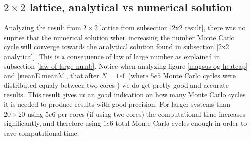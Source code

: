 \documentclass[a4paper, 10pt]{article}
\begin{document}
\subsection{$2\times 2$ lattice, analytical vs numerical solution}
Analyzing the result from $2\times 2$ lattice from subsection \eqref{2x2 result}, there was no suprise that the numerical
solution when increasing the number Monte Carlo cycle will converge towards the analytical solution found in subsection \eqref{2x2 analytical}.
This is a consequence of law of large number as explained in subsection \eqref{law of large numb}. Notice when analyzing figure \eqref{magsus og heatcap} and \eqref{meanE meanM},
that after $N = 1e6$  (where $5e5$ Monte Carlo cycles were distributed equaly between two cores
) we do get pretty good and accurate results. This result gives us an good indication on
how many Monte Carlo cycles it is needed to produce results with good precision. For larger systems than $20\times 20$ using $5e6$ per cores (if using two cores)
the computational time increases significantly, and therefore using $1e6$ total Monte Carlo cycles enough in order to save computational time.
\end{document}
